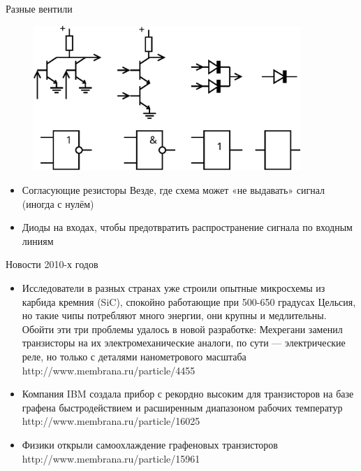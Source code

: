 \documentclass[xetex,aspectratio=43]{beamer}
\begin{document}
\begin{frame}{Разные вентили}
    \begin{figure}
    \includegraphics[width=0.9\textwidth]{img/07.transistor-gates.pdf}
    \end{figure}

    \begin{itemize}
    \tightlist
    \item
      Согласующие резисторы Везде, где схема может «не выдавать» сигнал
      (иногда с нулём)
    \item
      Диоды на входах, чтобы предотвратить распространение сигнала по
      входным линиям
    \end{itemize}
\end{frame}

\begin{frame}{Новости 2010-х годов}
\begin{itemize}
\item
  Исследователи в разных странах уже строили опытные микросхемы из
  карбида кремния (SiC), спокойно работающие при 500-650 градусах
  Цельсия, но такие чипы потребляют много энергии, они крупны и
  медлительны. Обойти эти три проблемы удалось в новой разработке:
  Мехрегани заменил транзисторы на их электромеханические аналоги, по
  сути --- электрические реле, но только с деталями нанометрового
  масштаба http://www.membrana.ru/particle/4455
\item
  Компания IBM создала прибор с рекордно высоким для транзисторов на
  базе графена быстродействием и расширенным диапазоном рабочих
  температур http://www.membrana.ru/particle/16025
\item
  Физики открыли самоохлаждение графеновых транзисторов
  http://www.membrana.ru/particle/15961
\end{itemize}

\end{frame}
\end{document}
